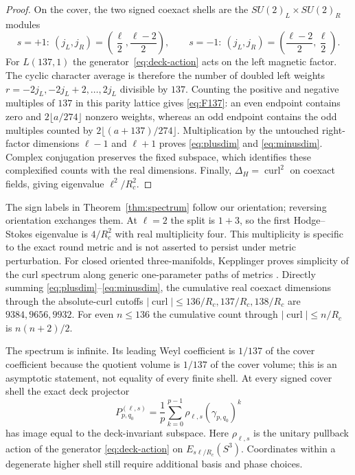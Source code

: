 \documentclass[12pt]{article}
\theoremstyle{definition}
\theoremstyle{remark}
\newcommand{\curl}{\operatorname{curl}}
\begin{document}
\begin{proof}
On the cover, the two signed coexact shells are the
$SU(2)_L\times SU(2)_R$ modules
\[
 s=+1:\ (j_L,j_R)=\left(\frac\ell2,\frac{\ell-2}{2}\right),
 \qquad
 s=-1:\ (j_L,j_R)=\left(\frac{\ell-2}{2},\frac\ell2\right).
\]
For $L(137,1)$ the generator~\eqref{eq:deck-action} acts on the left magnetic
factor.  The cyclic character average is therefore the number of doubled
left weights $r=-2j_L,-2j_L+2,\ldots,2j_L$ divisible by $137$.  Counting the
positive and negative multiples of $137$ in this parity lattice gives
\eqref{eq:F137}: an even endpoint contains zero and
$2\lfloor a/274\rfloor$ nonzero weights, whereas an odd endpoint contains
the odd multiples counted by $2\lfloor(a+137)/274\rfloor$.
Multiplication by the untouched right-factor dimensions $\ell-1$ and
$\ell+1$ proves \eqref{eq:plusdim} and \eqref{eq:minusdim}.  Complex
conjugation preserves the fixed subspace, which identifies these complexified
counts with the real dimensions.  Finally, $\Delta_H=\curl^2$ on coexact
fields, giving eigenvalue $\ell^2/R_c^2$.
\end{proof}

The sign labels in Theorem~\ref{thm:spectrum} follow our orientation; reversing
orientation exchanges them.  At $\ell=2$ the split is $1+3$, so the first
 Hodge--Stokes eigenvalue is $4/R_c^2$ with real multiplicity four.  This
 multiplicity is specific to the exact round metric and is not asserted to
 persist under metric perturbation.  For closed oriented three-manifolds,
Kepplinger proves simplicity of the curl spectrum along generic
one-parameter paths of metrics
\cite[Theorem~1.1]{Kepplinger2024}.  Directly
summing \eqref{eq:plusdim}--\eqref{eq:minusdim}, the cumulative real coexact
 dimensions through the absolute-curl cutoffs
 $|\curl|\le136/R_c,137/R_c,138/R_c$ are $9384,9656,9932$.  For even
 $n\le136$ the cumulative count through $|\curl|\le n/R_c$ is
 $n(n+2)/2$.

The spectrum is infinite.  Its leading Weyl coefficient is $1/137$ of the
cover coefficient because the quotient volume is $1/137$ of the cover volume;
this is an asymptotic statement, not equality of every finite shell.  At every
 signed cover shell the exact deck projector
 \[
 P_{p,q_0}^{(\ell,s)}
 =\frac1p\sum_{k=0}^{p-1}
   \rho_{\ell,s}(\gamma_{p,q_0})^k
 \]
has image equal to the deck-invariant subspace.  Here
$\rho_{\ell,s}$ is the unitary pullback action of the generator
\eqref{eq:deck-action} on $E_{s\ell/R_c}(S^3)$.  Coordinates within a
 degenerate higher shell still require additional basis and phase choices.
\end{document}

